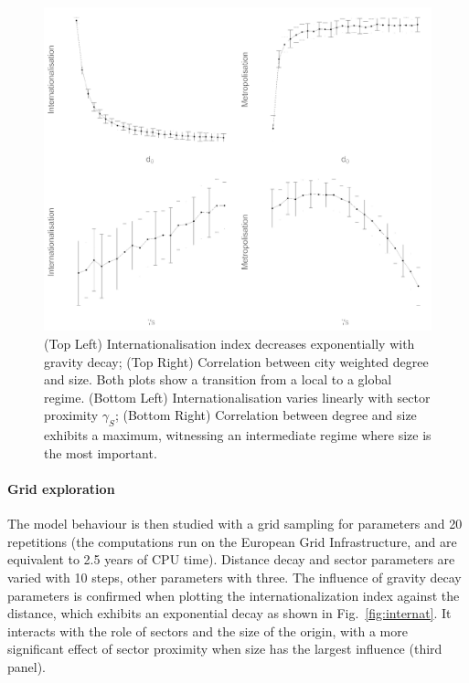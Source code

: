 \documentclass[10pt,letterpaper]{article}
\begin{document}
\begin{figure}
	\begin{center}
	    \includegraphics[width=\linewidth]{figures/Fig4.png}
	\end{center}
    \caption{(Top Left) Internationalisation index decreases exponentially with gravity decay; (Top Right) Correlation between city weighted degree and size. Both plots show a transition from a local to a global regime. (Bottom Left) Internationalisation varies linearly with sector proximity $\gamma_S$; (Bottom Right) Correlation between degree and size exhibits a maximum, witnessing an intermediate regime where size is the most important. \label{fig:fig4}}
\end{figure}



\paragraph{Grid exploration}

The model behaviour is then studied with a grid sampling for parameters and 20 repetitions (the computations run on the European Grid Infrastructure, and are equivalent to 2.5 years of CPU time). Distance decay and sector  parameters are varied with 10 steps, other parameters with three. The influence of gravity decay parameters is confirmed when plotting the internationalization index against the distance, which exhibits an exponential decay as shown in Fig.~\ref{fig:internat}. It interacts with the role of sectors and the size of the origin, with a more significant effect of sector proximity when size has the largest influence (third panel).
\end{document}
